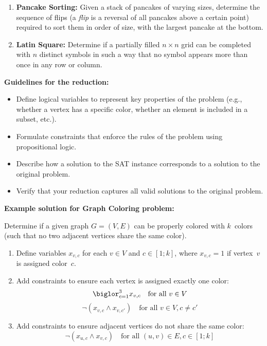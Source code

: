 \documentclass[a4paper,12pt]{article}
\begin{document}
\begin{tasks}
\begin{enumerate}[start=0]
        \item \textbf{Pancake Sorting:} Given a stack of pancakes of varying sizes, determine the sequence of flips (a \textit{flip} is a reversal of all pancakes above a certain point) required to sort them in order of size, with the largest pancake at the bottom.

        \item \textbf{Latin Square:} Determine if a partially filled $n \times n$ grid can be completed with $n$ distinct symbols in such a way that no symbol appears more than once in any row or column.
    \end{enumerate}

    \newpage

    \textbf{Guidelines for the reduction:}
    \begin{itemize}
        \item Define logical variables to represent key properties of the problem (e.g., whether a vertex has a specific color, whether an element is included in a subset, etc.).
        \item Formulate constraints that enforce the rules of the problem using propositional logic.
        \item Describe how a solution to the SAT instance corresponds to a solution to the original problem.
        \item Verify that your reduction captures all valid solutions to the original problem.
    \end{itemize}

    \medskip
    \textbf{Example solution for Graph Coloring problem:}

    Determine if a given graph $G = (V, E)$ can be properly colored with $k$~colors (such that no two adjacent vertices share the same color).

    \begin{enumerate}
        \item Define variables $x_{v,c}$ for each $v \in V$ and $c \in [1; k]$, where $x_{v,c} = 1$ if vertex~$v$ is assigned color~$c$.

        \item Add constraints to ensure each vertex is assigned exactly one color:
        \[
            \biglor_{c=1}^3 x_{v,c}
            \quad \text{for all } v \in V
        \]
        \[
            \neg(x_{v,c} \land x_{v,c'})
            \quad \text{for all } v \in V, c \neq c'
        \]

        \item Add constraints to ensure adjacent vertices do not share the same color:
        \[
            \neg(x_{u,c} \land x_{v,c})
            \quad \text{for all } (u, v) \in E, c \in [1; k]
        \]


\end{enumerate}
\end{tasks}
\end{document}
